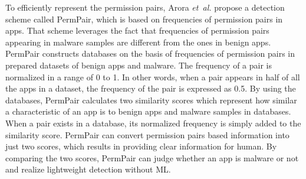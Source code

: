 \documentclass{ieeeaccess}
\newcommand{\etal}{\textit{et~al.}}
\begin{document}
To efficiently represent the permission pairs, Arora \etal \cite{arora2019permpair} propose a detection scheme called PermPair, which is based on frequencies of permission pairs in apps.
That scheme leverages the fact that frequencies of permission pairs appearing in malware samples are different from the ones in benign apps.
PermPair constructs databases on the basis of frequencies of permission pairs in prepared datasets of benign apps and malware.
The frequency of a pair is normalized in a range of 0 to 1.
In other words, when a pair appears in half of all the apps in a dataset, the frequency of the pair is expressed as 0.5.
By using the databases, PermPair calculates two similarity scores which represent how similar a characteristic of an app is to benign apps and malware samples in databases.
When a pair exists in a database, its normalized frequency is simply added to the similarity score.
PermPair can convert permission pairs based information into just two scores, which results in providing clear information for human.
By comparing the two scores, PermPair can judge whether an app is malware or not and realize lightweight detection without ML.
\end{document}
